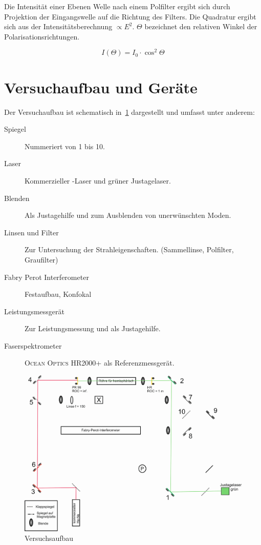 \documentclass[slug=GL, room=HZDR\ Dresden/Rossendorf\,\ Geb.\ 620/123, supervisor=Tim\ Ziegler]{../../Lab_Report_LaTeX/lab_report}
\newcommand{\hne}{\ce{HeNe}-Laser}
\begin{document}
Die Intensit\"at einer Ebenen Welle nach einem Polfilter ergibt sich
durch Projektion der Eingangswelle auf die Richtung des Filters. Die
Quadratur ergibt sich aus der Intensit\"atsberechnung \(\propto
E^2\). \(\Theta\) bezeichnet den relativen Winkel der
Polarisationsrichtungen.

\begin{equation}
  \label{eq:malus}
  I(\Theta)=I_0\cdot \cos^2{\Theta}
\end{equation}

\section{Versuchaufbau und Ger\"ate}
\label{sec:versuaufb}

Der Versuchaufbau ist schematisch in~\ref{fig:aufb} dargestellt und umfasst unter anderem:

\begin{description}
\item[Spiegel] Nummeriert von 1 bis 10.
\item[Laser] Kommerzieller \hne{} und gr\"uner Justagelaser.
\item[Blenden] Als Justagehilfe und zum Ausblenden von unerw\"unschten Moden.
\item[Linsen und Filter] Zur Untersuchung der Strahleigenschaften. (Sammellinse, Polfilter, Graufilter)
\item[Fabry Perot Interferometer] Festaufbau, Konfokal
\item[Leistungsmessger\"at] Zur Leistungsmessung und als Justagehilfe.
\item[Faserspektrometer] \textsc{Ocean Optics HR2000+} als Referenzmessger\"at.
\end{description}


\begin{figure}[H]\centering
  \includegraphics[width=.5\columnwidth]{aufb.png}
  \caption[Aufbau]{Versuchsaufbau}
  \label{fig:aufb}
\end{figure}
\end{document}
